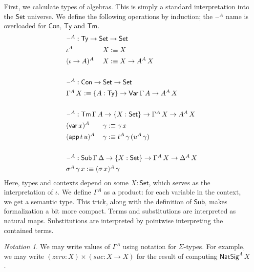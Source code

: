 \documentclass[12pt,a4paper,twoside,openany]{book}
\theoremstyle{remark}
\newtheorem{notation}{Notation}
\theoremstyle{definition}
\newcommand{\mi}[1]{\mathit{#1}}
\newcommand{\ms}[1]{\mathsf{#1}}
\newcommand{\Con}{\mathsf{Con}}
\newcommand{\Sub}{\mathsf{Sub}}
\newcommand{\Tm}{\mathsf{Tm}}
\newcommand{\Ty}{\mathsf{Ty}}
\newcommand{\blank}{\mathord{\hspace{1pt}\text{--}\hspace{1pt}}}
\newcommand{\Set}{\mathsf{Set}}
\newcommand{\Var}{\ms{Var}}
\newcommand{\var}{\ms{var}}
\newcommand{\app}{\ms{app}}
\newcommand{\defn}{:\equiv}
\begin{document}
First, we calculate types of algebras. This is simply a standard interpretation
into the $\Set$ universe. We define the following operations by induction; the
$\blank^A$ name is overloaded for $\Con$, $\Ty$ and $\Tm$.
\begin{alignat*}{3}
& \hspace{-4em} \rlap{$\blank^A : \Ty \to \Set \to \Set$} \\
& \hspace{-4em} \iota^A\,&&X \defn X \\
& \hspace{-4em} (\iota\to A)^A\,&&X \defn X \to A^A\,X\\
& \hspace{-4em} && \\
& \hspace{-4em} \rlap{$\blank^A : \Con \to \Set \to \Set$}\\
& \hspace{-4em} \rlap{$\Gamma^A\,X \defn \{A : \Ty\} \to \Var\,\Gamma\,A \to A^A\,X$}\\
& \hspace{-4em} && \\
& \hspace{-4em} \rlap{$\blank^A : \Tm\,\Gamma\,A \to \{X : \Set\} \to \Gamma^A\,X \to A^A\,X$}\\
& \hspace{-4em} (\var\,x)^A\,&&\gamma \defn \gamma\,x\\
& \hspace{-4em} (\app\,t\,u)^A\,&&\gamma \defn t^A\,\gamma\,(u^A\,\gamma)\\
& \hspace{-4em} && \\
& \hspace{-4em} \rlap{$\blank^A : \Sub\,\Gamma\,\Delta \to \{X : \Set\} \to \Gamma^A\,X \to \Delta^A\,X$}\\
& \hspace{-4em} \rlap{$\sigma^A\,\gamma\,x \defn (\sigma\,x)^A\,\gamma$}
\end{alignat*}
Here, types and contexts depend on some $X : \Set$, which serves as the
interpretation of $\iota$. We define $\Gamma^A$ as a product: for each variable
in the context, we get a semantic type. This trick, along with the definition of
$\Sub$, makes formalization a bit more compact. Terms and substitutions are
interpreted as natural maps. Substitutions are interpreted by pointwise interpreting
the contained terms.

\begin{notation}
We may write values of $\Gamma^A$ using notation for $\Sigma$-types. For
example, we may write $(\mi{zero} : X) \times (\mi{suc} : X \to X)$ for the
result of computing $\ms{NatSig}^A\,X$.
\end{notation}
\end{document}
